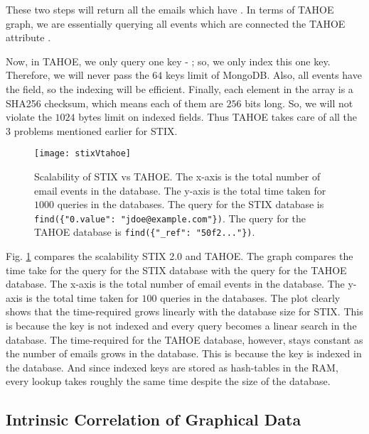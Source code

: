 These two steps will return all the emails which have . In terms of TAHOE graph, we are essentially querying all events which are connected the TAHOE attribute .

Now, in TAHOE, we only query one key - ; so, we only index this one key. Therefore, we will never pass the $64$ keys limit of MongoDB. Also, all events have the  field, so the indexing will be efficient. Finally, each element in the  array is a SHA256 checksum, which means each of them are $256$ bits long. So, we will not violate the $1024$ bytes limit on indexed fields. Thus TAHOE takes care of all the $3$ problems mentioned earlier for STIX.

\begin{figure}[!ht]
    \texttt{[image: stixVtahoe]} %
    \centering
    \caption{Scalability of STIX vs TAHOE. The x-axis is the total number of email events in the database. The y-axis is the total time taken for $1000$ queries in the databases. The query for the STIX database is \texttt{find(\{"0.value": "jdoe@example.com"\})}. The query for the TAHOE database is \texttt{find(\{"\_ref": "50f2..."\})}.}
    \label{fig:stixVtahoe}
\end{figure}

Fig. \ref{fig:stixVtahoe} compares the scalability STIX 2.0 and TAHOE. The graph compares the time take for the  query for the STIX database with the  query for the TAHOE database. The x-axis is the total number of email events in the database. The y-axis is the total time taken for $100$ queries in the databases. The plot clearly shows that the time-required grows linearly with the database size for STIX. This is because the key  is not indexed and every query becomes a linear search in the database. The time-required for the TAHOE database, however, stays constant as the number of emails grows in the database. This is because the key  is indexed in the database. And since indexed keys are stored as hash-tables in the RAM, every lookup takes roughly the same time despite the size of the database.



\subsection{Intrinsic Correlation of Graphical Data}\label{ss:fcorr}


